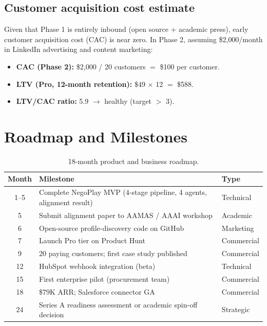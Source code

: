 \documentclass[11pt, a4paper, oneside]{report}
\begin{document}
\section{Customer acquisition cost estimate}

Given that Phase 1 is entirely inbound (open source + academic press),
early customer acquisition cost (CAC) is near zero. In Phase 2, assuming
\$2{,}000/month in LinkedIn advertising and content marketing:

\begin{itemize}[leftmargin=*]
    \item \textbf{CAC (Phase 2):} \$2{,}000 / 20 customers $=$ \$100 per customer.
    \item \textbf{LTV (Pro, 12-month retention):} \$49 $\times$ 12 $=$ \$588.
    \item \textbf{LTV/CAC ratio:} 5.9 $\rightarrow$ healthy (target $>$ 3).
\end{itemize}

\chapter{Roadmap and Milestones}
\label{ch:roadmap}

\begin{table}[H]
\centering\small
\caption{18-month product and business roadmap.}
\begin{tabularx}{\textwidth}{c X l}
\toprule
\textbf{Month} & \textbf{Milestone} & \textbf{Type} \\
\midrule
1--5   & Complete NegoPlay MVP (4-stage pipeline, 4 agents, alignment result)
        & Technical \\
5      & Submit alignment paper to AAMAS / AAAI workshop
        & Academic \\
6      & Open-source profile-discovery code on GitHub
        & Marketing \\
7      & Launch Pro tier on Product Hunt
        & Commercial \\
9      & 20 paying customers; first case study published
        & Commercial \\
12     & HubSpot webhook integration (beta)
        & Technical \\
15     & First enterprise pilot (procurement team)
        & Commercial \\
18     & \$79K ARR; Salesforce connector GA
        & Commercial \\
24     & Series A readiness assessment or academic spin-off decision
        & Strategic \\
\bottomrule
\end{tabularx}
\end{table}
\end{document}
